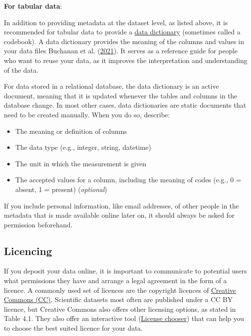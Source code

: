 \documentclass[
]{book}
\begin{document}
\textbf{For tabular data}:

In addition to providing metadata at the dataset level, as listed above, it is recommended for tabular data to provide a \protect\hyperlink{data-dictionary}{data dictionary} (sometimes called a codebook). A data dictionary provides the meaning of the columns and values in your data files Buchanan et al. (\protect\hyperlink{ref-Buchanan_2021}{2021}). It serves as a reference guide for people who want to reuse your data, as it improves the interpretation and understanding of the data.

For data stored in a relational database, the data dictionary is an active document, meaning that it is updated whenever the tables and columns in the database change. In most other cases, data dictionaries are static documents that need to be created manually. When you do so, describe:

\begin{itemize}
\item
  The meaning or definition of columns
\item
  The data type (e.g., integer, string, datetime)
\item
  The unit in which the measurement is given
\item
  The accepted values for a column, including the meaning of codes (e.g., 0 = absent, 1 = present) (\emph{optional})
\end{itemize}

If you include personal information, like email addresses, of other people in the metadata that is made available online later on, it should always be asked for permission beforehand.

\hypertarget{licencing}{%
\subsection{Licencing}\label{licencing}}

If you deposit your data online, it is important to communicate to potential users what permissions they have and arrange a legal agreement in the form of a licence. A commonly used set of licences are the copyright licences of \href{https://creativecommons.org/share-your-work/cclicenses/}{Creative Commons (CC)}. Scientific datasets most often are published under a CC BY licence, but Creative Commons also offers other licensing options, as stated in Table 4.1. They also offer an interactive tool (\href{https://chooser-beta.creativecommons.org/}{License chooser}) that can help you to choose the best suited licence for your data.
\end{document}
